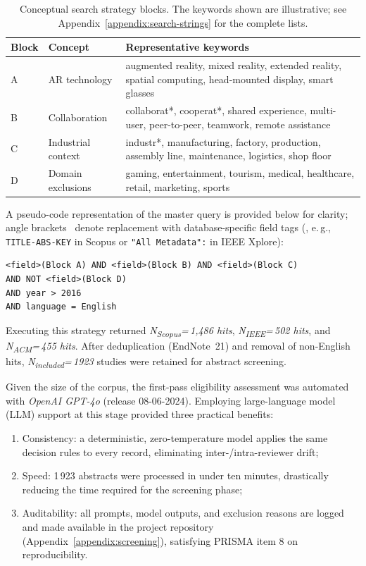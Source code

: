 \begin{table}[t!]
    \centering
    \caption{Conceptual search strategy blocks. The keywords shown are illustrative; see Appendix~\ref{appendix:search-strings} for the complete lists.}
    \label{tab:search-blocks}
    \begin{tabular}{@{}p{1.2cm}p{3cm}p{7.3cm}@{}}
        \toprule
        \textbf{Block} & \textbf{Concept} & \textbf{Representative keywords} \\ \midrule
        A & AR technology & augmented reality, mixed reality, extended reality, spatial computing, head-mounted display, smart glasses \\
        B & Collaboration & collaborat*, cooperat*, shared experience, multi-user, peer-to-peer, teamwork, remote assistance \\
        C & Industrial context & industr*, manufacturing, factory, production, assembly line, maintenance, logistics, shop floor \\
        D & Domain exclusions & gaming, entertainment, tourism, medical, healthcare, retail, marketing, sports \\ \bottomrule
    \end{tabular}
\end{table}

A pseudo-code representation of the master query is provided below for clarity; angle brackets \textlangle{}\,\textrangle{} denote replacement with database-specific field tags (, e.\,g., \texttt{TITLE-ABS-KEY} in Scopus or \texttt{"All Metadata":} in IEEE Xplore):

\begin{verbatim}
<field>(Block A) AND <field>(Block B) AND <field>(Block C)
AND NOT <field>(Block D)
AND year > 2016
AND language = English
\end{verbatim}

Executing this strategy returned \textit{N\textsubscript{Scopus}=\,1,486 hits}, \textit{N\textsubscript{IEEE}=\,502 hits}, and \textit{N\textsubscript{ACM}=\,455 hits}. After deduplication (EndNote~21) and removal of non-English hits, \textit{N\textsubscript{included}=\,1923} studies were retained for abstract screening.

Given the size of the corpus, the first-pass eligibility assessment was automated with \emph{OpenAI GPT-4o} (release 08-06-2024). Employing large-language model (LLM) support at this stage provided three practical benefits:
\begin{enumerate}
\item Consistency: a deterministic, zero-temperature model applies the same decision rules to every record, eliminating inter-/intra-reviewer drift;
\item Speed: 1\,923 abstracts were processed in under ten minutes, drastically reducing the time required for the screening phase;
\item Auditability: all prompts, model outputs, and exclusion reasons are logged and made available in the project repository (Appendix~\ref{appendix:screening}), satisfying PRISMA item 8 on reproducibility.
\end{enumerate}


